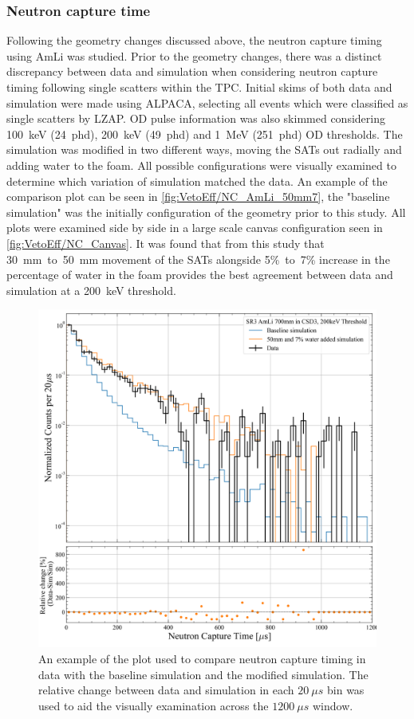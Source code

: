 \subsubsection{Neutron capture time}
Following the geometry changes discussed above, the neutron capture timing using AmLi was studied. Prior to the geometry changes, there was a distinct discrepancy between data and simulation when considering neutron capture timing following single scatters within the TPC. Initial skims of both data and simulation were made using ALPACA, selecting all events which were classified as single scatters by LZAP. OD pulse information was also skimmed considering 100~keV (24~phd), 200~keV (49~phd) and 1~MeV (251~phd) OD thresholds.
The simulation was modified in two different ways, moving the SATs out radially and adding water to the foam. All possible configurations were visually examined to determine which variation of simulation matched the data. An example of the comparison plot can be seen in \autoref{fig:VetoEff/NC_AmLi_50mm7}, the "baseline simulation" was the initially configuration of the geometry prior to this study. All plots were examined side by side in a large scale canvas configuration seen in \autoref{fig:VetoEff/NC_Canvas}. It was found that from this study that 30~mm~to~50~mm movement of the SATs alongside 5\%~to~7\% increase in the percentage of water in the foam provides the best agreement between data and simulation at a 200~keV threshold.
\begin{figure}
	\centering
	\includegraphics[width=0.8\linewidth]{figures/VetoEfficiency/movedSAT50mm_7percentWater_AmLi_CSD3_Z700mm_200keV_Ratio.png}
	\caption{An example of the plot used to compare neutron capture timing in data with the baseline simulation and the modified simulation. The relative change between data and simulation in each $20~\mu s$ bin was used to aid the visually examination across the $1200~\mu s$ window.}
	\label{fig:VetoEff/NC_AmLi_50mm7}
\end{figure}
